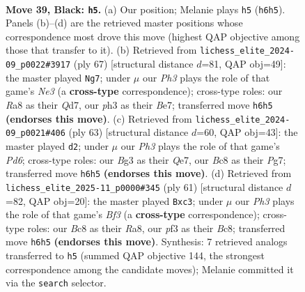 \documentclass[11pt]{article}
\begin{document}
\begin{figure}[p]
\label{fig:thought-m75}
\end{figure}

\clearpage

\begin{figure}[p]\centering
\begin{subfigure}{0.46\textwidth}\centering
\resizebox{\linewidth}{!}{%
\newchessgame
\chessboard[
  setfen={r1bq3k/ppp2pp1/5n1p/8/8/4QPbP/PPBB2P1/R5K1 b - - 19 39},
  showmover=false,
  pgfstyle=straightmove, color=movearrow, markmove={h6-h5}
]}
\caption{}
\end{subfigure}\hfill
\begin{subfigure}{0.46\textwidth}\centering
\resizebox{\linewidth}{!}{%
\newchessgame
\chessboard[
  setfen={6k1/1p1qbp2/1Bprn3/5p1p/8/P4QP1/1P3PB1/4R1K1 b - - 1 34},
  showmover=false,
  pgfstyle=straightmove, color=movearrow, markmove={e6-g7}
]}
\caption{}
\end{subfigure}
\\[4pt]
\begin{subfigure}{0.46\textwidth}\centering
\resizebox{\linewidth}{!}{%
\newchessgame
\chessboard[
  setfen={3r3k/p3q1p1/1pp2bBp/2n2P2/5B2/3p3P/P5P1/1Q3R1K b - - 4 32},
  showmover=false,
  pgfstyle=straightmove, color=movearrow, markmove={d3-d2}
]}
\caption{}
\end{subfigure}\hfill
\begin{subfigure}{0.46\textwidth}\centering
\resizebox{\linewidth}{!}{%
\newchessgame
\chessboard[
  setfen={r1b2q1k/6pp/p2p1b2/2pP4/1P3P2/2B4P/2Q2NP1/1R4K1 b - - 0 31},
  showmover=false,
  pgfstyle=straightmove, color=movearrow, markmove={f6-c3}
]}
\caption{}
\end{subfigure}
\caption{\textbf{Move 39, Black: \texttt{h5}.} (a) Our position; Melanie plays \texttt{h5} (\texttt{h6h5}). Panels (b)--(d) are the retrieved master positions whose correspondence most drove this move (highest QAP objective among those that transfer to it). (b) Retrieved from \texttt{lichess\_elite\_2024-09\_p0022\#3917} (ply 67) [structural distance $d$=81, QAP obj=49]: the master played \texttt{Ng7}; under $\mu$ our \emph{Ph3} plays the role of that game's \emph{Ne3} (a \textbf{cross-type} correspondence); cross-type roles: our \emph{R}a8 as their \emph{Q}d7, our \emph{p}h3 as their \emph{B}e7; transferred move \texttt{h6h5} \textbf{(endorses this move)}. (c) Retrieved from \texttt{lichess\_elite\_2024-09\_p0021\#406} (ply 63) [structural distance $d$=60, QAP obj=43]: the master played \texttt{d2}; under $\mu$ our \emph{Ph3} plays the role of that game's \emph{Pd6}; cross-type roles: our \emph{B}g3 as their \emph{Q}e7, our \emph{B}c8 as their \emph{P}g7; transferred move \texttt{h6h5} \textbf{(endorses this move)}. (d) Retrieved from \texttt{lichess\_elite\_2025-11\_p0000\#345} (ply 61) [structural distance $d$=82, QAP obj=20]: the master played \texttt{Bxc3}; under $\mu$ our \emph{Ph3} plays the role of that game's \emph{Bf3} (a \textbf{cross-type} correspondence); cross-type roles: our \emph{B}c8 as their \emph{R}a8, our \emph{p}f3 as their \emph{B}c8; transferred move \texttt{h6h5} \textbf{(endorses this move)}. Synthesis: 7 retrieved analogs transferred to \texttt{h5} (summed QAP objective 144, the strongest correspondence among the candidate moves); Melanie committed it via the \texttt{search} selector.}

\end{figure}
\end{document}
